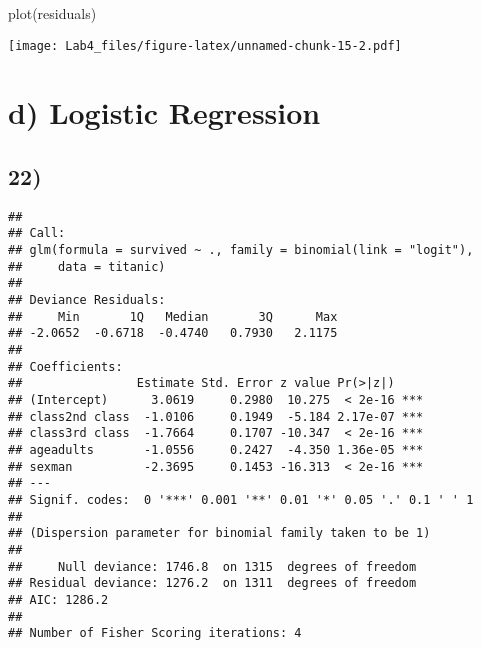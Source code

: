 \documentclass[
]{article}
\newenvironment{Shaded}{\begin{snugshade}}{\end{snugshade}}
\newcommand{\AttributeTok}[1]{\textcolor[rgb]{0.77,0.63,0.00}{#1}}
\newcommand{\FunctionTok}[1]{\textcolor[rgb]{0.00,0.00,0.00}{#1}}
\newcommand{\NormalTok}[1]{#1}
\newcommand{\OtherTok}[1]{\textcolor[rgb]{0.56,0.35,0.01}{#1}}
\newcommand{\SpecialCharTok}[1]{\textcolor[rgb]{0.00,0.00,0.00}{#1}}
\newcommand{\StringTok}[1]{\textcolor[rgb]{0.31,0.60,0.02}{#1}}
\begin{document}
\begin{Shaded}
\begin{Highlighting}[]
\FunctionTok{plot}\NormalTok{(residuals)}
\end{Highlighting}
\end{Shaded}

\texttt{[image: Lab4\_files/figure-latex/unnamed-chunk-15-2.pdf]}

\hypertarget{d-logistic-regression}{%
\section{d) Logistic Regression}\label{d-logistic-regression}}

\hypertarget{section-20}{%
\subsection{22)}\label{section-20}}

\begin{Shaded}
\end{Shaded}

\begin{verbatim}
## 
## Call:
## glm(formula = survived ~ ., family = binomial(link = "logit"), 
##     data = titanic)
## 
## Deviance Residuals: 
##     Min       1Q   Median       3Q      Max  
## -2.0652  -0.6718  -0.4740   0.7930   2.1175  
## 
## Coefficients:
##                Estimate Std. Error z value Pr(>|z|)    
## (Intercept)      3.0619     0.2980  10.275  < 2e-16 ***
## class2nd class  -1.0106     0.1949  -5.184 2.17e-07 ***
## class3rd class  -1.7664     0.1707 -10.347  < 2e-16 ***
## ageadults       -1.0556     0.2427  -4.350 1.36e-05 ***
## sexman          -2.3695     0.1453 -16.313  < 2e-16 ***
## ---
## Signif. codes:  0 '***' 0.001 '**' 0.01 '*' 0.05 '.' 0.1 ' ' 1
## 
## (Dispersion parameter for binomial family taken to be 1)
## 
##     Null deviance: 1746.8  on 1315  degrees of freedom
## Residual deviance: 1276.2  on 1311  degrees of freedom
## AIC: 1286.2
## 
## Number of Fisher Scoring iterations: 4
\end{verbatim}
\end{document}
